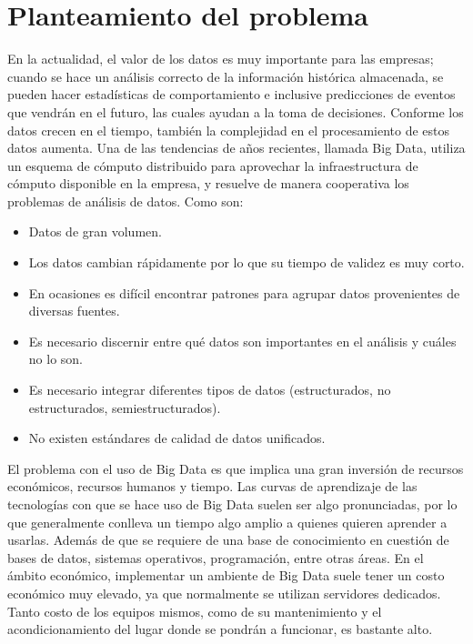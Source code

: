 \section{Planteamiento del problema}
En la actualidad, el valor de los datos es muy importante para las empresas; cuando se hace un análisis correcto de la información histórica almacenada, se pueden hacer estadísticas de comportamiento e inclusive predicciones de eventos que vendrán en el futuro, las cuales ayudan a la toma de decisiones. Conforme los datos crecen en el tiempo, también la complejidad en el procesamiento de estos datos aumenta. Una de las tendencias de años recientes, llamada Big Data, utiliza un esquema de cómputo distribuido para aprovechar la infraestructura de cómputo disponible en la empresa, y resuelve de manera cooperativa los problemas de análisis de datos. Como son:\\
\begin{itemize}
\item Datos de gran volumen.\\
\item Los datos cambian rápidamente por lo que su tiempo de validez es muy corto.\\
\item En ocasiones es difícil encontrar patrones para agrupar datos provenientes de diversas fuentes.\\
\item Es necesario discernir entre qué datos son importantes en el análisis y cuáles no lo son.\\
\item Es necesario integrar diferentes tipos de datos (estructurados, no estructurados, semiestructurados).\\
\item No existen estándares de calidad de datos unificados.\\
\end{itemize}
El problema con el uso de Big Data es que implica una gran inversión de recursos económicos, recursos humanos y tiempo. Las curvas de aprendizaje de las tecnologías con que se hace uso de Big Data suelen ser algo pronunciadas, por lo que generalmente conlleva un tiempo algo amplio a quienes quieren aprender a usarlas. Además de que se requiere de una base de conocimiento en cuestión de bases de datos, sistemas operativos, programación, entre otras áreas. En el ámbito económico, implementar un ambiente de Big Data suele tener un costo económico muy elevado, ya que normalmente se utilizan servidores dedicados. Tanto costo de los equipos mismos, como de su mantenimiento y el acondicionamiento del lugar donde se pondrán a funcionar, es bastante alto.\\

